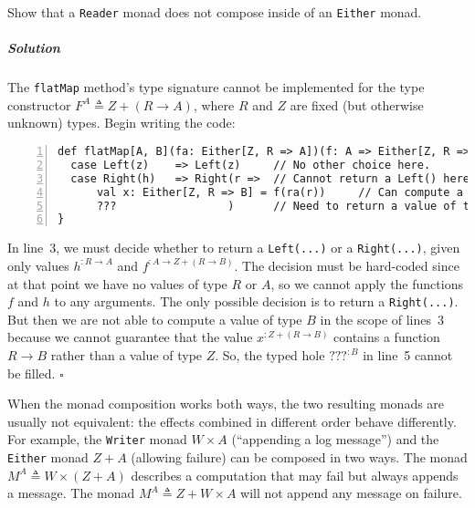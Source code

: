 Show that a \lstinline!Reader! monad does not compose inside of an
\lstinline!Either! monad.

\subparagraph{Solution}

The \lstinline!flatMap! method\textsf{'}s type signature cannot be implemented
for the type constructor $F^{A}\triangleq Z+\left(R\rightarrow A\right)$,
where $R$ and $Z$ are fixed (but otherwise unknown) types. Begin
writing the code:
\begin{lstlisting}[numbers=left]
def flatMap[A, B](fa: Either[Z, R => A])(f: A => Either[Z, R => B]): Either[Z, R => B] = fa match {
  case Left(z)    => Left(z)     // No other choice here.
  case Right(h)   => Right(r =>  // Cannot return a Left() here, since we have no values of type Z.
      val x: Either[Z, R => B] = f(ra(r))     // Can compute a value `x` of type Either[Z, R => B].
      ???                 )      // Need to return a value of type B here, using only r, ra, and f.
}
\end{lstlisting}
In line~3, we must decide whether to return a \lstinline!Left(...)!
or a \lstinline!Right(...)!, given only values $h^{:R\rightarrow A}$
and $f^{:A\rightarrow Z+\left(R\rightarrow B\right)}$. The decision
must be hard-coded since at that point we have no values of type $R$
or $A$, so we cannot apply the functions $f$ and $h$ to any arguments.
The only possible decision is to return a \lstinline!Right(...)!.
But then we are not able to compute a value of type $B$ in the scope
of lines~3 because we cannot guarantee that the value
$x^{:Z+\left(R\rightarrow B\right)}$ contains a function $R\rightarrow B$
rather than a value of type $Z$. So, the typed hole $\text{???}^{:B}$
in line~5 cannot be filled. $\square$

When the monad composition works both ways, the two resulting monads
are usually not equivalent: the effects combined in different order
behave differently. For example, the \lstinline!Writer! monad $W\times A$
(\textsf{``}appending a log message\textsf{''}) and the \lstinline!Either! monad
$Z+A$ (allowing failure) can be composed in two ways. The monad $M^{A}\triangleq W\times\left(Z+A\right)$
describes a computation that may fail but always appends a message.
The monad $M^{A}\triangleq Z+W\times A$ will not append any message
on failure.

